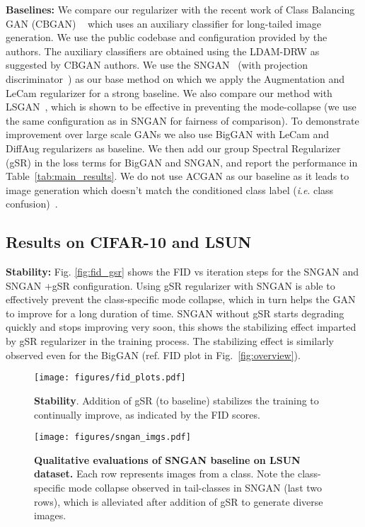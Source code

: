 \documentclass[runningheads,table]{llncs}
\newcommand{\ie}{\textit{i}.\textit{e}. }
\begin{document}
\noindent\textbf{Baselines:} We compare our regularizer with the recent work of Class Balancing GAN (CBGAN) ~\cite{rangwani2021class} which uses an auxiliary classifier for long-tailed image generation. We use the public codebase and configuration provided by the authors.
The auxiliary classifiers are obtained using the LDAM-DRW as suggested by CBGAN authors. We use the SNGAN~\cite{miyato2018spectral} (with projection discriminator~\cite{miyato2018cgans}) as our base method on which we apply the Augmentation and LeCam regularizer for a strong baseline. We also compare our method with LSGAN~\cite{mao2017least}, which is shown to be effective in preventing the mode-collapse (we use the same configuration as in SNGAN for fairness of comparison). To demonstrate improvement over large scale GANs we also use BigGAN \cite{brock2018large} with LeCam and DiffAug regularizers as baseline.  We then add our group Spectral Regularizer (gSR) in the loss terms for BigGAN and SNGAN, and report the performance in \mbox{Table~\ref{tab:main_results}.} We do not use ACGAN as our baseline as it leads to image generation which doesn't match the conditioned class label (\ie class confusion)~\cite{rangwani2021class}. 


\subsection{Results on CIFAR-10 and LSUN}
\label{sec:synth_dist_results}



\noindent\textbf{Stability:} Fig. \ref{fig:fid_gsr} shows the FID vs iteration steps for the SNGAN and 
SNGAN +gSR configuration. Using gSR regularizer with SNGAN is able to effectively prevent the class-specific mode collapse, which in turn helps the GAN to improve for a long duration of time. SNGAN without gSR starts degrading quickly and stops improving very soon, this shows the stabilizing effect imparted by gSR regularizer in the training process. The stabilizing effect is similarly observed even for the BigGAN (ref. FID plot in Fig.~\ref{fig:overview}).
\begin{figure*}[t]
  \centering
\begin{minipage}[c]{0.34\linewidth}
    \centering
    \texttt{[image: figures/fid\_plots.pdf]}
    \caption{\textbf{Stability}. Addition of gSR (to baseline) stabilizes the training to continually improve, as indicated by the FID scores.}
    \label{fig:fid_gsr}
  \end{minipage}
   \hfill
  \begin{minipage}[c]{0.64\textwidth}
    \centering
    \texttt{[image: figures/sngan\_imgs.pdf]}
    \begin{minipage}{1cm}
    \vfill
    \end{minipage}
    \caption{\textbf{Qualitative evaluations of SNGAN baseline on LSUN dataset.} Each row represents images from a class. Note the class-specific mode collapse observed in tail-classes in SNGAN (last two rows), which is alleviated after addition of gSR to generate diverse images.}
    \label{fig:sngan_imgs}
  \end{minipage}
\end{figure*}
\end{document}
